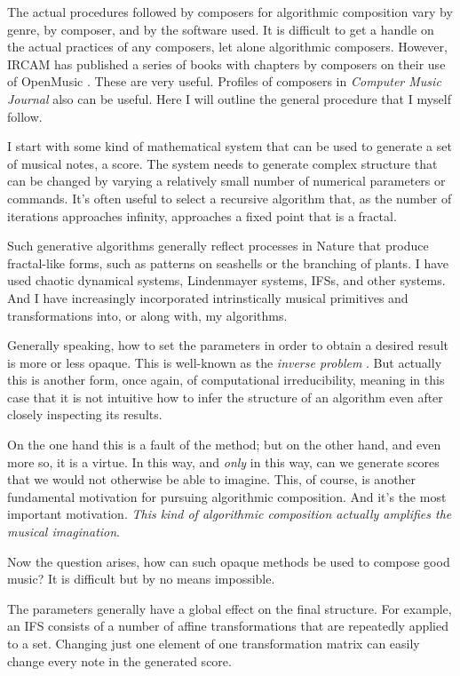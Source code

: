 \documentclass[11pt,papersize=a4]{scrartcl}
\begin{document}
The actual procedures followed by composers for algorithmic composition vary by genre, by composer, and by the software used. It is difficult to get a handle on the actual practices of any composers, let alone algorithmic composers. However, IRCAM has published a series of books with chapters by composers on their use of OpenMusic \parencite{omcomposersbook, agon2006om, agon2008om, agon2016om}. These are very useful. Profiles of composers in \emph{Computer Music Journal} also can be useful. Here I will outline the general procedure that I myself follow.

I start with some kind of mathematical system that can be used to generate a set of musical notes, a score. The system needs to generate complex structure that can be changed by varying a relatively small number of numerical parameters or commands. It’s often useful to select a recursive algorithm that, as the number of iterations approaches infinity, approaches a fixed point that is a fractal. 

Such generative algorithms generally reflect processes in Nature that produce fractal-like forms, such as patterns on seashells or the branching of plants. I have used chaotic dynamical systems, Lindenmayer systems, IFSs, and other systems. And I have increasingly incorporated intrinstically musical primitives and transformations into, or along with, my algorithms.

Generally speaking, how to set the parameters in order to obtain a desired result is more or less opaque. This is well-known as the \emph{inverse problem} \parencite{graham2021applying, tu2023learning}. But actually this is another form, once again, of computational irreducibility, meaning in this case that it is not intuitive how to infer the structure of an algorithm even after closely inspecting its results. 

On the one hand this is a fault of the method; but on the other hand, and even more so, it is a virtue. In this way, and \emph{only} in this way, can we generate scores that we would not otherwise be able to imagine. This, of course, is another fundamental motivation for pursuing algorithmic composition. And it's the most important motivation. \emph{This kind of algorithmic composition actually amplifies the musical imagination}.

Now the question arises, how can such opaque methods be used to compose good music? It is difficult but by no means impossible.

The parameters generally have a global effect on the final structure. For example, an IFS consists of a number of affine transformations that are repeatedly applied to a set. Changing just one element of one transformation matrix can easily change every note in the generated score.
\end{document}
